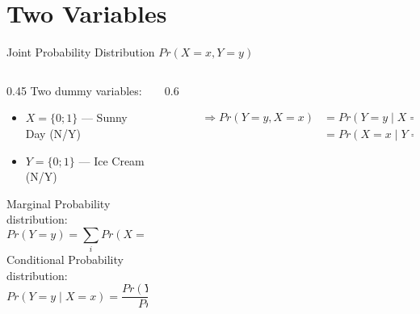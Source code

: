 \documentclass[notes,10pt, aspectratio=169]{beamer}
\begin{document}
\section{Two Variables}

\begin{frame}{Joint Probability Distribution $Pr(X=x, Y=y)$}
 \begin{columns}
\begin{column}{0.45\textwidth}
Two dummy variables:
    \begin{itemize}
    \item $X = \{0;1\}$ --- Sunny Day (N/Y)
    \item $Y = \{0;1\}$ --- Ice Cream (N/Y)
    \end{itemize}
\vspace{.5cm}
Marginal Probability distribution:
\begin{equation*}
    Pr(Y=y) = \sum_i Pr(X=x_i, Y=y)
\end{equation*}
Conditional Probability distribution:
\begin{equation*}
    Pr(Y=y \mid X=x) = \frac{Pr(Y=y, X=x)}{Pr(X=x)}
\end{equation*}

\end{column}
\begin{column}{0.6\textwidth}
\vspace{1.2cm}
\begin{figure}
        \begin{table}
        \end{table}
\vspace{1cm}
\begin{eqnarray*}
\Rightarrow Pr(Y=y, X=x) &= Pr(Y=y \mid X=x)Pr(X=x)\\
                             &= Pr(X=x \mid Y=y)Pr(Y=y)
\end{eqnarray*}
\end{figure}
\end{column}
\end{columns}
\end{frame}
\end{document}

